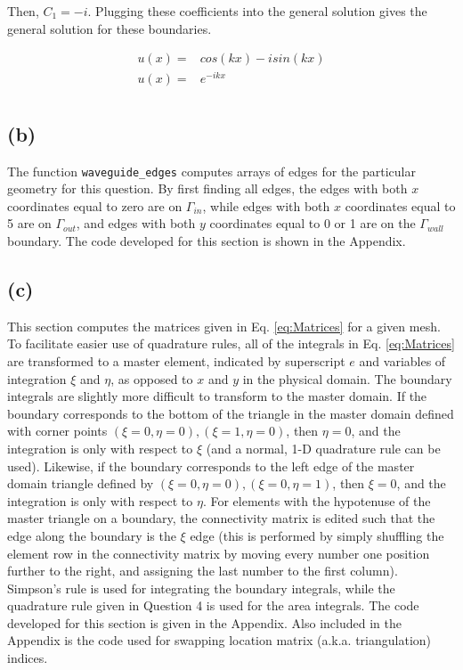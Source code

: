 \documentclass[10pt]{article}
\newcommand{\beqa}{\begin{equation}\begin{aligned}}
\newcommand{\eeqa}{\end{aligned}\end{equation}}
\begin{document}
Then, \(C_1=-i\). Plugging these coefficients into the general solution gives the general solution for these boundaries.

\beqa
u(x)=&cos(kx)-isin(kx)\\
u(x)=&e^{-ikx}\\
\eeqa

\subsection{(b)}

The function {\tt waveguide\_edges} computes arrays of edges for the particular geometry for this question. By first finding all edges, the edges with both \(x\) coordinates equal to zero are on \(\Gamma_{in}\), while edges with both \(x\) coordinates equal to 5 are on \(\Gamma_{out}\), and edges with both \(y\) coordinates equal to 0 or 1 are on the \(\Gamma_{wall}\) boundary. The code developed for this section is shown in the Appendix.

\subsection{(c)}

This section computes the matrices given in Eq. \eqref{eq:Matrices} for a given mesh. To facilitate easier use of quadrature rules, all of the integrals in Eq. \eqref{eq:Matrices} are transformed to a master element, indicated by superscript \(e\) and variables of integration \(\xi\) and \(\eta\), as opposed to \(x\) and \(y\) in the physical domain. The boundary integrals are slightly more difficult to transform to the master domain. If the boundary corresponds to the bottom of the triangle in the master domain defined with corner points \((\xi=0,\eta=0), (\xi=1,\eta=0)\), then \(\eta=0\), and the integration is only with respect to \(\xi\) (and a normal, 1-D quadrature rule can be used). Likewise, if the boundary corresponds to the left edge of the master domain triangle defined by \((\xi=0,\eta=0), (\xi=0,\eta=1)\), then \(\xi=0\), and the integration is only with respect to \(\eta\). For elements with the hypotenuse of the master triangle on a boundary, the connectivity matrix is edited such that the edge along the boundary is the \(\xi\) edge (this is performed by simply shuffling the element row in the connectivity matrix by moving every number one position further to the right, and assigning the last number to the first column). Simpson's rule is used for integrating the boundary integrals, while the quadrature rule given in Question 4 is used for the area integrals. The code developed for this section is given in the Appendix. Also included in the Appendix is the code used for swapping location matrix (a.k.a. triangulation) indices.
\end{document}
